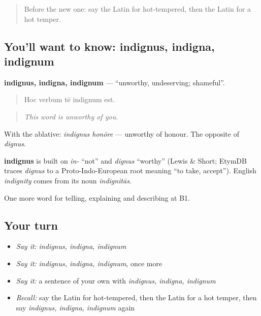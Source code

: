 \begin{quote}
Before the new one: say the Latin for hot-tempered, then the Latin for a hot temper.
\end{quote}

\subsection*{You'll want to know: indignus, indigna, indignum}
\textbf{indignus, indigna, indignum} — \textquotedblleft{}unworthy, undeserving; shameful\textquotedblright{}.

\begin{quote}
Hoc verbum tē indignum est.
\end{quote}

\begin{quote}
\emph{This word is unworthy of you.}
\end{quote}

With the ablative: \emph{indignus honōre} — unworthy of honour. The opposite of \emph{dignus}.

\begin{cousinweb}
\textbf{indignus} is built on \emph{in-} \textquotedblleft{}not\textquotedblright{} and \emph{dignus} \textquotedblleft{}worthy\textquotedblright{} (Lewis \& Short; EtymDB traces \emph{dignus} to a Proto-Indo-European root meaning \textquotedblleft{}to take, accept\textquotedblright{}). English \emph{indignity} comes from its noun \emph{indignitās}.
\end{cousinweb}

\begin{grammarlens}[title={What you've built}]
One more word for telling, explaining and describing at B1.
\end{grammarlens}

\subsection*{Your turn}
\begin{itemize}
\raggedright
  \item \emph{Say it:} \emph{indignus, indigna, indignum}
  \item \emph{Say it:} \emph{indignus, indigna, indignum}, once more
  \item \emph{Say it:} a sentence of your own with \emph{indignus, indigna, indignum}
  \item \emph{Recall:} say the Latin for hot-tempered, then the Latin for a hot temper, then say \emph{indignus, indigna, indignum} again
\end{itemize}

